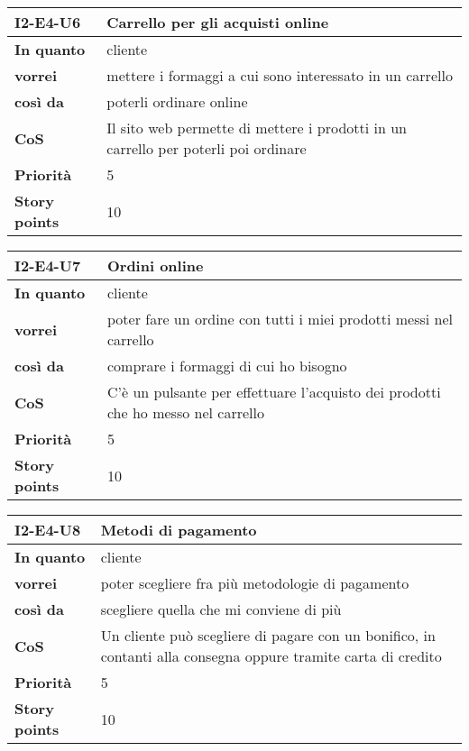 \begin{table}[H]
  \begin{tabularx}{\textwidth}{lX}
    \toprule
    \textbf{I2-E4-U6} & \textbf{Carrello per gli acquisti online} \\
    \midrule
    \textbf{In quanto} & cliente \\
    \textbf{vorrei} & mettere i formaggi a cui sono interessato in un carrello \\
    \textbf{così da} & poterli ordinare online \\
    \midrule
    \textbf{CoS} & Il sito web permette di mettere i prodotti in un carrello per poterli poi ordinare \\
    \midrule
    \textbf{Priorità} & 5 \\
    \textbf{Story points} & 10 \\
    \bottomrule
  \end{tabularx}
  \label{user-story:i2-e4-u6}
\end{table}

\begin{table}[H]
  \begin{tabularx}{\textwidth}{lX}
    \toprule
    \textbf{I2-E4-U7} & \textbf{Ordini online} \\
    \midrule
    \textbf{In quanto} & cliente \\
    \textbf{vorrei} & poter fare un ordine con tutti i miei prodotti messi nel carrello \\
    \textbf{così da} & comprare i formaggi di cui ho bisogno \\
    \midrule
    \textbf{CoS} & C'è un pulsante per effettuare l'acquisto dei prodotti che ho messo nel carrello \\
    \midrule
    \textbf{Priorità} & 5 \\
    \textbf{Story points} & 10 \\
    \bottomrule
  \end{tabularx}
  \label{user-story:i2-e4-u7}
\end{table}

\begin{table}[H]
  \begin{tabularx}{\textwidth}{lX}
    \toprule
    \textbf{I2-E4-U8} & \textbf{Metodi di pagamento} \\
    \midrule
    \textbf{In quanto} & cliente \\
    \textbf{vorrei} & poter scegliere fra più metodologie di pagamento \\
    \textbf{così da} & scegliere quella che mi conviene di più \\
    \midrule
    \textbf{CoS} & Un cliente può scegliere di pagare con un bonifico, in contanti alla consegna oppure tramite carta di credito \\
    \midrule
    \textbf{Priorità} & 5 \\
    \textbf{Story points} & 10 \\
    \bottomrule
  \end{tabularx}
  \label{user-story:i2-e4-u8}
\end{table}

